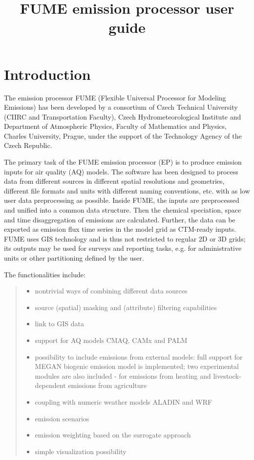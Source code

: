 \documentclass[a4paper,11pt]{article}
\begin{document}
\title{FUME emission processor user guide}
\maketitle

\tableofcontents

\newpage


\section{Introduction}\label{introduction}

The emission processor FUME (Flexible Universal Processor for Modeling Emissions) has been
developed by a consortium of Czech Technical University (CIIRC and
Transportation Faculty), Czech Hydrometeorological Institute and Department of
Atmospheric Physics, Faculty of Mathematics and Physics, Charles
University, Prague, under the support of the Technology Agency of the Czech
Republic.

The primary task of the FUME emission processor (EP) is to produce emission inputs for air quality (AQ) models. The software has been designed to process data from different sources in different spatial resolutions and geometries, different file formats and units with different naming conventions, etc. with as low user data preprocessing as possible. Inside FUME, the inputs are preprocessed and unified into a common data structure. Then the chemical speciation, space and time disaggregation of emissions are calculated. Further, the data can be exported as emission flux time series in the model grid as CTM-ready inputs. 
FUME uses GIS technology and is thus not restricted to regular 2D or 3D grids; its
outputs may be used for surveys and reporting tasks, e.g. for administrative units or other
partitioning defined by the user.

The functionalities include:
\begin{quote}
\begin{itemize}
\item
  nontrivial ways of combining different data sources
\item
  source (spatial) masking and (attribute) filtering capabilities
\item
  link to GIS data
\item
  support for AQ models CMAQ, CAMx and PALM
\item
  possibility to include emissions from external models: full support for MEGAN biogenic emission model is implemented; two experimental modules are also included - for emissions from heating and livestock-dependent emissions from agriculture
\item
  coupling with numeric weather models ALADIN and WRF
\item
  emission scenarios
\item
  emission weighting based on the surrogate approach
\item
  simple visualization possibility
\end{itemize}
\end{quote}
\end{document}

